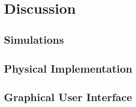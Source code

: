 
\section{Discussion}
\subsection{Simulations}
\label{discussion:sim}

\subsection{Physical Implementation}


\subsection{Graphical User Interface}

